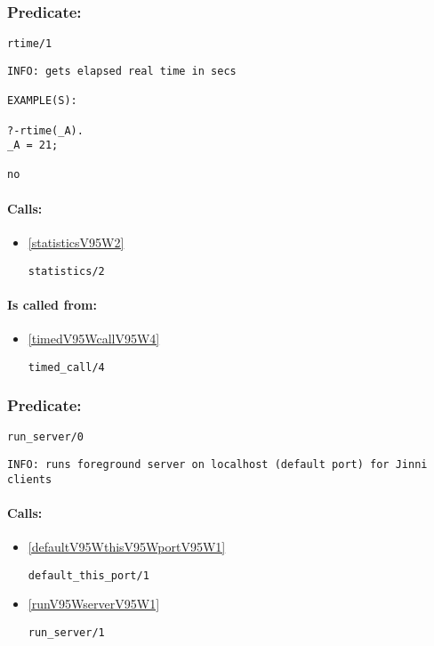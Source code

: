 \subsubsection{Predicate:} \label{rtimeV95W1}

\begin{verbatim}
rtime/1
\end{verbatim}

{\small \begin{verbatim}
INFO: gets elapsed real time in secs

EXAMPLE(S):

?-rtime(_A).
_A = 21;

no

\end{verbatim}}
\paragraph{Calls:} 
\begin{itemize}
\item \ref{statisticsV95W2} 
\begin{verbatim}
statistics/2
\end{verbatim}

\end{itemize}
\paragraph{Is called from:} 
\begin{itemize}
\item \ref{timedV95WcallV95W4} 
\begin{verbatim}
timed_call/4
\end{verbatim}

\end{itemize}

\subsubsection{Predicate:} \label{runV95WserverV95W0}

\begin{verbatim}
run_server/0
\end{verbatim}

{\small \begin{verbatim}
INFO: runs foreground server on localhost (default port) for Jinni clients

\end{verbatim}}
\paragraph{Calls:} 
\begin{itemize}
\item \ref{defaultV95WthisV95WportV95W1} 
\begin{verbatim}
default_this_port/1
\end{verbatim}

\item \ref{runV95WserverV95W1} 
\begin{verbatim}
run_server/1
\end{verbatim}

\end{itemize}

